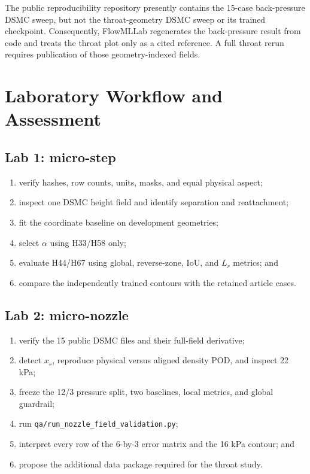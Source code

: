 \documentclass[11pt]{article}
\begin{document}
\begin{warningbox}
The public reproducibility repository presently contains the 15-case
back-pressure DSMC sweep, but not the throat-geometry DSMC sweep or its trained
checkpoint. Consequently, FlowMLLab regenerates the back-pressure result from
code and treats the throat plot only as a cited reference. A full throat rerun
requires publication of those geometry-indexed fields.
\end{warningbox}

\clearpage
\section{Laboratory Workflow and Assessment}
\subsection{Lab 1: micro-step}
\begin{enumerate}
\item verify hashes, row counts, units, masks, and equal physical aspect;
\item inspect one DSMC height field and identify separation and reattachment;
\item fit the coordinate baseline on development geometries;
\item select $\alpha$ using H33/H58 only;
\item evaluate H44/H67 using global, reverse-zone, IoU, and $L_r$ metrics; and
\item compare the independently trained contours with the retained article cases.
\end{enumerate}

\subsection{Lab 2: micro-nozzle}
\begin{enumerate}
\item verify the 15 public DSMC files and their full-field derivative;
\item detect $x_s$, reproduce physical versus aligned density POD, and inspect 22 kPa;
\item freeze the 12/3 pressure split, two baselines, local metrics, and global guardrail;
\item run \texttt{qa/run\_nozzle\_field\_validation.py};
\item interpret every row of the 6-by-3 error matrix and the 16 kPa contour; and
\item propose the additional data package required for the throat study.
\end{enumerate}
\end{document}
